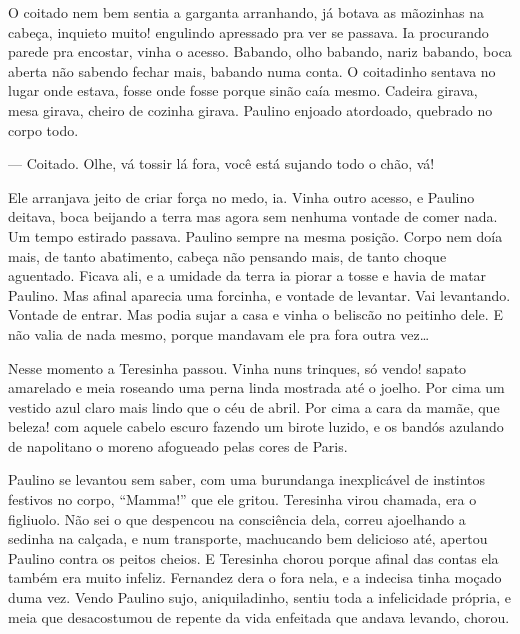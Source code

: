 O coitado nem bem sentia a garganta arranhando, já botava as mãozinhas
na cabeça, inquieto muito! engulindo apressado pra ver se passava. Ia
procurando parede pra encostar, vinha o acesso. Babando, olho babando,
nariz babando, boca aberta não sabendo fechar mais, babando numa conta.
O coitadinho sentava no lugar onde estava, fosse onde fosse porque sinão
caía mesmo. Cadeira girava, mesa girava, cheiro de cozinha girava.
Paulino enjoado atordoado, quebrado no corpo todo.

--- Coitado. Olhe, vá tossir lá fora, você está sujando todo o chão, vá!

Ele arranjava jeito de criar força no medo, ia. Vinha outro acesso, e
Paulino deitava, boca beijando a terra mas agora sem nenhuma vontade de
comer nada. Um tempo estirado passava. Paulino sempre na mesma posição.
Corpo nem doía mais, de tanto abatimento, cabeça não pensando mais, de
tanto choque aguentado. Ficava ali, e a umidade da terra ia piorar a
tosse e havia de matar Paulino. Mas afinal aparecia uma forcinha, e
vontade de levantar. Vai levantando. Vontade de entrar. Mas podia sujar
a casa e vinha o beliscão no peitinho dele. E não valia de nada mesmo,
porque mandavam ele pra fora outra vez\ldots{} 


Nesse momento a Teresinha passou. Vinha nuns trinques, só vendo! sapato
amarelado e meia roseando uma perna linda mostrada até o joelho. Por
cima um vestido azul claro mais lindo que o céu de abril. Por cima a
cara da mamãe, que beleza! com aquele cabelo escuro fazendo um birote
luzido, e os bandós azulando de napolitano o moreno afogueado pelas
cores de Paris.

Paulino se levantou sem saber, com uma burundanga inexplicável de
instintos festivos no corpo, ``Mamma!'' que ele gritou. Teresinha virou
chamada, era o figliuolo. Não sei o que despencou na consciência dela,
correu ajoelhando a sedinha na calçada, e num transporte, machucando bem
delicioso até, apertou Paulino contra os peitos cheios. E Teresinha
chorou porque afinal das contas ela também era muito infeliz. Fernandez
dera o fora nela, e a indecisa tinha moçado duma vez. Vendo Paulino
sujo, aniquiladinho, sentiu toda a infelicidade própria, e meia que
desacostumou de repente da vida enfeitada que andava levando, chorou.

